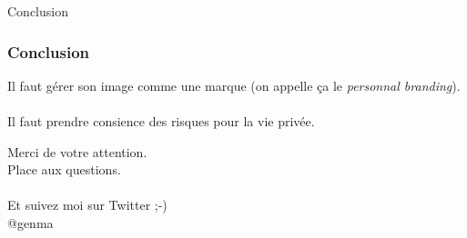 \documentclass{beamer}
\begin{document}
\begin{frame}
\begin{center}
\Huge{Conclusion}
\end{center}
\end{frame}
\begin{frame}
\frametitle{Conclusion}

Il faut gérer son image comme une marque (on appelle ça le \emph{personnal branding}).
\\~\\
Il faut prendre consience des risques pour la vie privée.

\end{frame}
\begin{frame}
\begin{center}
\Huge{Merci de votre attention. \\Place aux questions.
\\~\\Et suivez moi sur Twitter ;-)\\ @genma
}\end{center}
\end{frame}
\end{document}
